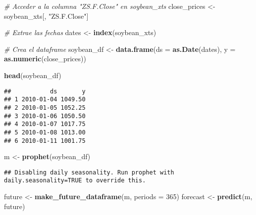 \documentclass[
]{book}
\newenvironment{Shaded}{\begin{snugshade}}{\end{snugshade}}
\newcommand{\AttributeTok}[1]{\textcolor[rgb]{0.13,0.29,0.53}{#1}}
\newcommand{\CommentTok}[1]{\textcolor[rgb]{0.56,0.35,0.01}{\textit{#1}}}
\newcommand{\DecValTok}[1]{\textcolor[rgb]{0.00,0.00,0.81}{#1}}
\newcommand{\FunctionTok}[1]{\textcolor[rgb]{0.13,0.29,0.53}{\textbf{#1}}}
\newcommand{\NormalTok}[1]{#1}
\newcommand{\OtherTok}[1]{\textcolor[rgb]{0.56,0.35,0.01}{#1}}
\newcommand{\StringTok}[1]{\textcolor[rgb]{0.31,0.60,0.02}{#1}}
\begin{document}
\begin{Shaded}
\begin{Highlighting}[]
\CommentTok{\# Acceder a la columna "ZS.F.Close" en soybean\_xts}
\NormalTok{close\_prices }\OtherTok{\textless{}{-}}\NormalTok{ soybean\_xts[, }\StringTok{"ZS.F.Close"}\NormalTok{]}

\CommentTok{\# Extrae las fechas}
\NormalTok{dates }\OtherTok{\textless{}{-}} \FunctionTok{index}\NormalTok{(soybean\_xts)}

\CommentTok{\# Crea el dataframe}
\NormalTok{soybean\_df }\OtherTok{\textless{}{-}} \FunctionTok{data.frame}\NormalTok{(}\AttributeTok{ds =} \FunctionTok{as.Date}\NormalTok{(dates), }\AttributeTok{y =} \FunctionTok{as.numeric}\NormalTok{(close\_prices))}
\end{Highlighting}
\end{Shaded}

\begin{Shaded}
\begin{Highlighting}[]
\FunctionTok{head}\NormalTok{(soybean\_df)}
\end{Highlighting}
\end{Shaded}

\begin{verbatim}
##           ds       y
## 1 2010-01-04 1049.50
## 2 2010-01-05 1052.25
## 3 2010-01-06 1050.50
## 4 2010-01-07 1017.75
## 5 2010-01-08 1013.00
## 6 2010-01-11 1001.75
\end{verbatim}

\begin{Shaded}
\begin{Highlighting}[]
\NormalTok{m }\OtherTok{\textless{}{-}} \FunctionTok{prophet}\NormalTok{(soybean\_df)}
\end{Highlighting}
\end{Shaded}

\begin{verbatim}
## Disabling daily seasonality. Run prophet with daily.seasonality=TRUE to override this.
\end{verbatim}

\begin{Shaded}
\begin{Highlighting}[]
\NormalTok{future }\OtherTok{\textless{}{-}} \FunctionTok{make\_future\_dataframe}\NormalTok{(m, }\AttributeTok{periods =} \DecValTok{365}\NormalTok{) }
\NormalTok{forecast }\OtherTok{\textless{}{-}} \FunctionTok{predict}\NormalTok{(m, future)}
\end{Highlighting}
\end{Shaded}
\end{document}
